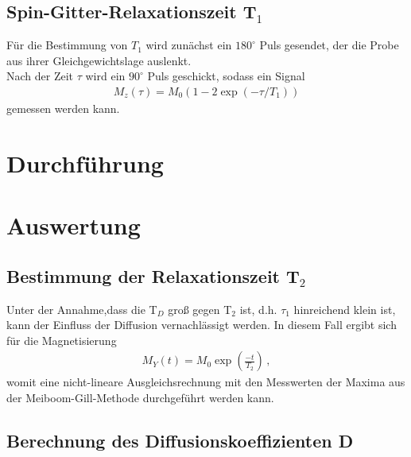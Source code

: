 \documentclass[]{scrartcl}
\begin{document}
\subsection{Spin-Gitter-Relaxationszeit T$_1$}
Für die Bestimmung von $T_1$ wird zunächst ein $180^\circ$ Puls gesendet, der die Probe aus ihrer Gleichgewichtslage auslenkt.\\
Nach der Zeit $\tau$ wird ein $90^\circ$ Puls geschickt, sodass ein Signal 
\begin{align}
M_{z}(\tau)=M_0(1-2\exp(-\tau/T_1))
\label{eq_T1}
\end{align}
gemessen werden kann.
\section{Durchführung}

\section{Auswertung}

\subsection{Bestimmung der Relaxationszeit T$_2$}
Unter der Annahme,dass die T$_D$ groß gegen T$_2$ ist, d.h. $\tau_1$ hinreichend klein ist, kann der Einfluss der Diffusion vernachlässigt werden. In diesem Fall ergibt sich für die Magnetisierung 
\begin{align}
M_Y(t)=M_0\exp\left( \frac{-t}{T_2}\right)\, ,
\end{align}
womit eine nicht-lineare Ausgleichsrechnung mit den Messwerten der Maxima aus der Meiboom-Gill-Methode durchgeführt werden kann.


\subsection{Berechnung des Diffusionskoeffizienten D}
\end{document}
